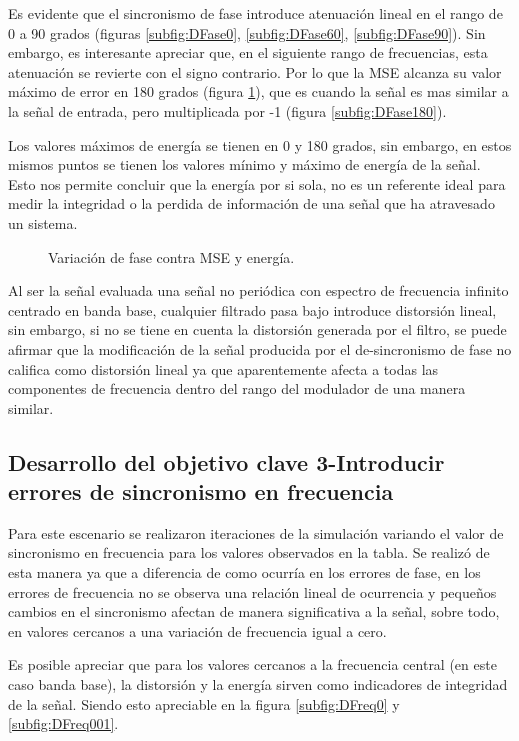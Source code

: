 Es evidente que el sincronismo de fase introduce atenuación lineal en el rango de 0 a 90 grados (figuras \ref{subfig:DFase0}, \ref{subfig:DFase60}, \ref{subfig:DFase90}). Sin embargo, es interesante apreciar que, en el siguiente rango de frecuencias, esta atenuación se revierte con el signo contrario. Por lo que la MSE alcanza su valor máximo de error en 180 grados (figura \ref{fig:erroresFase}), que es cuando la señal es mas similar a la señal de entrada, pero multiplicada por -1 (figura \ref{subfig:DFase180}).

Los valores máximos de energía se tienen en 0 y 180 grados, sin embargo, en estos mismos puntos se tienen los valores mínimo y máximo de energía de la señal. Esto nos permite concluir que la energía por si sola, no es un referente ideal para medir la integridad o la perdida de información de una señal que ha atravesado un sistema.
\begin{figure}[H]
	\centering
	\def\svgwidth{8.8cm}
	\tiny
	\caption{\scriptsize Variación de fase contra MSE y energía.}
	\vspace{-3mm}
	\label{fig:erroresFase}
\end{figure}
Al ser la señal evaluada una señal no periódica con espectro de frecuencia infinito centrado en banda base, cualquier filtrado pasa bajo introduce distorsión lineal, sin embargo, si no se tiene en cuenta la distorsión generada por el filtro, se puede afirmar que la modificación de la señal producida por el de-sincronismo de fase no califica como distorsión lineal ya que aparentemente afecta a todas las componentes de frecuencia dentro del rango del modulador de una manera similar.

\subsection{Desarrollo del objetivo clave 3-Introducir errores de sincronismo en frecuencia}
Para este escenario se realizaron iteraciones de la simulación variando el valor de sincronismo en frecuencia para los valores observados en la tabla. Se realizó de esta manera ya que a diferencia de como ocurría en los errores de fase, en los errores de frecuencia no se observa una relación lineal de ocurrencia y pequeños cambios en el sincronismo afectan de manera significativa a la señal, sobre todo, en valores cercanos a una variación de frecuencia igual a cero.

Es posible apreciar que para los valores cercanos a la frecuencia central (en este caso banda base), la distorsión y la energía sirven como indicadores de integridad de la señal. Siendo esto apreciable en la figura \ref{subfig:DFreq0} y \ref{subfig:DFreq001}.

